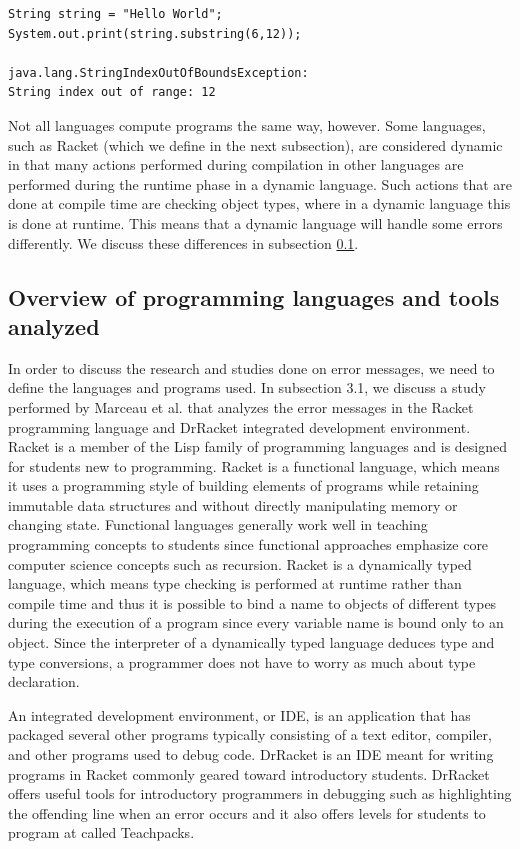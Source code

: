 \documentclass{sig-alternate}
\begin{document}
\begin{verbatim}
String string = "Hello World";
System.out.print(string.substring(6,12));

java.lang.StringIndexOutOfBoundsException:
String index out of range: 12
\end{verbatim}

Not all languages compute programs the same way, however.
Some languages, such as Racket (which we define in the next subsection), are considered dynamic in that many actions performed during compilation in other languages are performed during the runtime phase in a dynamic language.
Such actions that are done at compile time are checking object types, where in a dynamic language this is done at runtime.
This means that a dynamic language will handle some errors differently.
We discuss these differences in subsection \ref{subsec:languages}.


\subsection{Overview of programming languages and tools analyzed}\label{subsec:languages}

In order to discuss the research and studies done on error messages, we need to define the languages and programs used.
In subsection 3.1, we discuss a study performed by Marceau et al. that analyzes the error messages in the Racket programming language and DrRacket integrated development environment.
Racket is a member of the Lisp family of programming languages and is designed for students new to programming.
Racket is a functional language, which means it uses a programming style of building elements of programs while retaining immutable data structures 
and without directly manipulating memory or changing state.
Functional languages generally work well in teaching programming concepts to students since functional approaches emphasize core computer science concepts such as recursion.
Racket is a dynamically typed language, which means type checking is performed at runtime rather than compile time and thus it is possible to bind a name to objects of different types during the execution of a program since every variable name is bound only to an object.
Since the interpreter of a dynamically typed language deduces type and type conversions, a programmer does not have to worry as much about type declaration.

An integrated development environment, or IDE, is an application that has packaged several other programs typically consisting of a text editor, compiler, and other programs used to debug code.
DrRacket is an IDE meant for writing programs in Racket commonly geared toward introductory students.
DrRacket offers useful tools for introductory programmers in debugging such as highlighting the offending line when an error occurs and it also offers levels for students to program at called Teachpacks.
\end{document}
